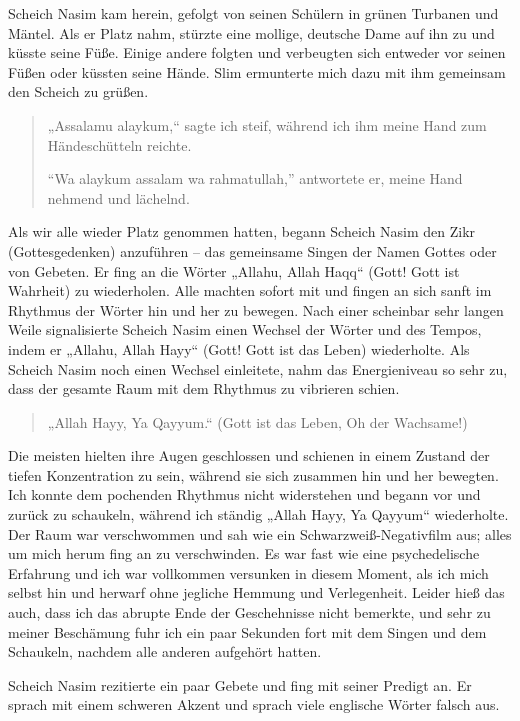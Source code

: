 \documentclass[12pt]{memoir}
\begin{document}
Scheich Nasim kam herein,
gefolgt von seinen Schülern in grünen Turbanen und Mäntel.
Als er Platz nahm, stürzte eine mollige,
deutsche Dame auf ihn zu und küsste seine Füße.
Einige andere folgten und verbeugten sich entweder vor seinen Füßen
oder küssten seine Hände.
Slim ermunterte mich dazu mit ihm gemeinsam den Scheich zu grüßen.

\begin{quote}
„Assalamu alaykum,“ sagte ich steif,
während ich ihm meine Hand zum Händeschütteln reichte.

“Wa alaykum assalam wa rahmatullah,” antwortete er,
meine Hand nehmend und lächelnd.
\end{quote}

Als wir alle wieder Platz genommen hatten,
begann Scheich Nasim den Zikr (Gottesgedenken) anzuführen –
das gemeinsame Singen der Namen Gottes oder von Gebeten.
Er fing an die Wörter „Allahu, Allah Haqq“
(Gott! Gott ist Wahrheit) zu wiederholen.
Alle machten sofort mit und fingen an
sich sanft im Rhythmus der Wörter hin und her zu bewegen.
Nach einer scheinbar sehr langen Weile signalisierte Scheich Nasim
einen Wechsel der Wörter und des Tempos,
indem er „Allahu, Allah Hayy“ (Gott! Gott ist das Leben) wiederholte.
Als Scheich Nasim noch einen Wechsel einleitete,
nahm das Energieniveau so sehr zu,
dass der gesamte Raum mit dem Rhythmus zu vibrieren schien.

\begin{quote}
„Allah Hayy, Ya Qayyum.“ (Gott ist das Leben, Oh der Wachsame!)
\end{quote}

Die meisten hielten ihre Augen geschlossen
und schienen in einem Zustand der tiefen Konzentration zu sein,
während sie sich zusammen hin und her bewegten.
Ich konnte dem pochenden Rhythmus nicht widerstehen
und begann vor und zurück zu schaukeln,
während ich ständig „Allah Hayy, Ya Qayyum“ wiederholte.
Der Raum war verschwommen und sah wie ein Schwarzweiß-Negativfilm aus;
alles um mich herum fing an zu verschwinden.
Es war fast wie eine psychedelische Erfahrung
und ich war vollkommen versunken in diesem Moment,
als ich mich selbst hin und herwarf ohne jegliche Hemmung und Verlegenheit.
Leider hieß das auch,
dass ich das abrupte Ende der Geschehnisse nicht bemerkte,
und sehr zu meiner Beschämung fuhr ich ein paar Sekunden fort
mit dem Singen und dem Schaukeln,
nachdem alle anderen aufgehört hatten.

Scheich Nasim rezitierte ein paar Gebete und fing mit seiner Predigt an.
Er sprach mit einem schweren Akzent
und sprach viele englische Wörter falsch aus.
\end{document}
